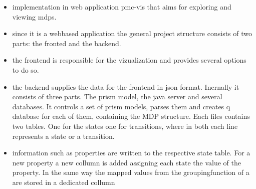 \documentclass[preview]{standalone}
\begin{document}
	\begin{itemize}
		\item implementation in web application pmc-vis that aims for exploring and viewing mdps.
		\item since it is a webbased application the general project structure consists of two parts: the fronted and the backend. 
		\item the frontend is responsible for the vizualization and provides several options to do so.
		\item the backend supplies the data for the frontend in json format. Inernally it consists of three parts. The prism model, the java server and several databases. It controls a set of prism models, parses them and creates q database for each of them, containing the MDP structure. Each files contains two tables. One for the states one for transitions, where in both each line represents a state or a transition. 
		\item information such as properties are written to the respective state table. For a new property a new collumn is added assigning each state the value of the property. In the same way the mapped values from the groupingfunction of a \viewN are stored in a dedicated collumn 
		

\end{itemize}
\end{document}

